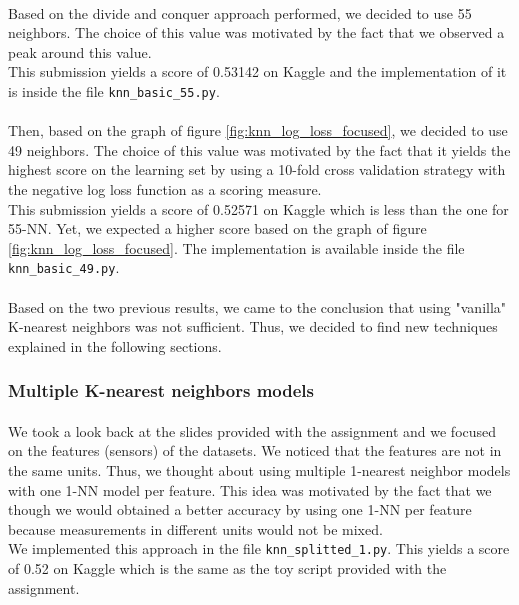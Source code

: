 \documentclass[a4paper, 11pt, oneside]{article}
\begin{document}
\paragraph{}Based on the divide and conquer approach performed, we decided to use 55 neighbors. The choice of this value was motivated by the fact that we observed a peak around this value.\\
This submission yields a score of 0.53142 on Kaggle and the implementation of it is inside the file \texttt{knn\_basic\_55.py}.
\paragraph{}Then, based on the graph of figure \ref{fig:knn_log_loss_focused}, we decided to use 49 neighbors. The choice of this value was motivated by the fact that it yields the highest score on the learning set by using a 10-fold cross validation strategy with the negative log loss function as a scoring measure.\\
This submission yields a score of 0.52571 on Kaggle which is less than the one for 55-NN. Yet, we expected a higher score based on the graph of figure \ref{fig:knn_log_loss_focused}. The implementation is available inside the file \texttt{knn\_basic\_49.py}.
\paragraph{}Based on the two previous results, we came to the conclusion that using "vanilla" K-nearest neighbors was not sufficient. Thus, we decided to find new techniques explained in the following sections.

\subsubsection{Multiple K-nearest neighbors models} \label{subsubsec:knnMultiple}
\paragraph{}We took a look back at the slides provided with the assignment and we focused on the features (sensors) of the datasets. We noticed that the features are not in the same units. Thus, we thought about using multiple 1-nearest neighbor models with one 1-NN model per feature. This idea was motivated by the fact that we though we would obtained a better accuracy by using one 1-NN per feature because measurements in different units would not be mixed.\\
We implemented this approach in the file \texttt{knn\_splitted\_1.py}. This yields a score of 0.52 on Kaggle which is the same as the toy script provided with the assignment.
\end{document}
